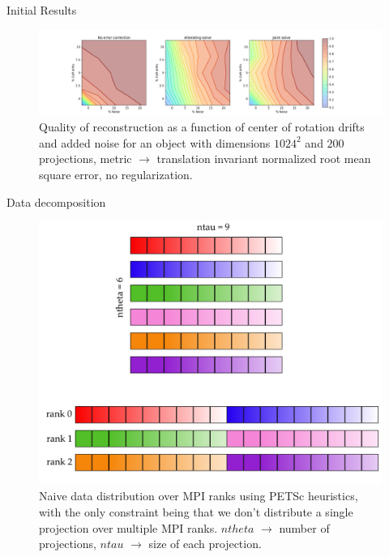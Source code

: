 \documentclass{beamer}
\begin{document}
\begin{frame}{Initial Results}
	\begin{center}
		\begin{figure}
			\hspace*{-2.25cm}\includegraphics[scale=0.3125]{figures/drifts_mag_tie}
			\caption{Quality of reconstruction as a function of center of rotation drifts and added noise for an object with dimensions $1024^2$ and $200$ projections, metric $\rightarrow$ translation invariant normalized root mean square error, no regularization.}
		\end{figure}
	\end{center}
\end{frame}

\begin{frame}{Data decomposition}
	\begin{center}
		\begin{figure}
			\hspace*{-1cm}\includegraphics[scale=0.3125]{figures/2d_dist_cropped}
			\caption{Naive data distribution over MPI ranks using PETSc heuristics, with the only constraint being that we don't distribute a single projection over multiple MPI ranks. $ntheta$ $\rightarrow$ number of projections, $ntau$ $\rightarrow$ size of each projection.}
		\end{figure}
	\end{center}
\end{frame}
\end{document}
